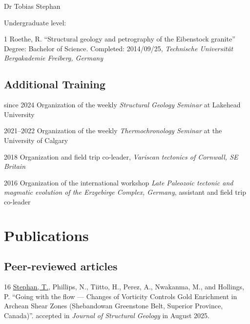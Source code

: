 \documentclass[10pt, paper=letter]{scrartcl} %
\begin{document}
\begin{cv}{\textsf{Dr Tobias Stephan}}
\begin{cvlist}{Undergraduate level:}
        \item[1] Roethe, R. \enquote{Structural geology and petrography of the Eibenstock granite}\\
        Degree: Bachelor of Science. Completed: 2014/09/25, \textit{Technische Universität Bergakademie Freiberg, Germany}
    \end{cvlist}

    \subsection{Additional Training}
    \begin{cvlist}{}
        \item[since 2024] Organization of the weekly \textit{Structural Geology Seminar} at
        Lakehead University
        \item[2021--2022] Organization of the weekly \textit{Thermochronology Seminar} at the University of Calgary
        \item[2018] Organization and field trip co-leader, \textit{Variscan tectonics of Cornwall, SE Britain}
        \item[2016] Organization of the international workshop \textit{Late Paleozoic tectonic and magmatic evolution of the Erzgebirge Complex, Germany}, assistant and field trip co-leader
    \end{cvlist}

    \section{Publications}
    \subsection{Peer-reviewed articles}
    \setul{1pt}{.4pt}%
    \begin{cvlist}{}
        \item[16] \ul{Stephan, T.}, Phillips, N., Tiitto, H., Perez, A., Nwakanma, M., and Hollings, P. \enquote{Going with the flow --- Changes of  Vorticity Controls Gold Enrichment in Archean Shear Zones (Shebandowan Greenstone Belt, Superior Province, Canada)}. accepted in \textit{Journal of Structural Geology} in August 2025.
        

\end{cvlist}
\end{cv}
\end{document}
